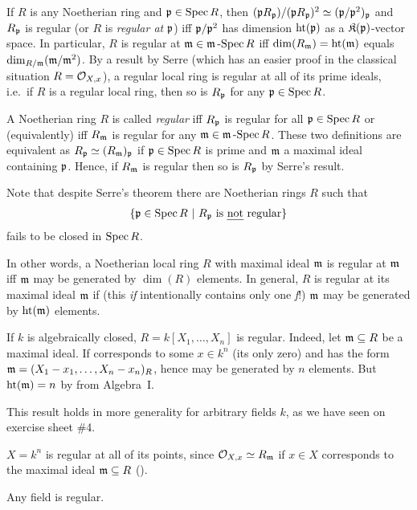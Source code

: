 \documentclass[a4paper,parskip=half,numbers=enddot, DIV=12, headheight=30pt]{scrreprt}
\begin{document}
\begin{rem}
    If $R$ is any Noetherian ring and $\mathfrak{p}\in \operatorname{Spec} R$, then $(\mathfrak{p} R_{\mathfrak{p}})/(\mathfrak{p} R_{\mathfrak{p}})^2 \simeq (\mathfrak{p}/\mathfrak{p}^2)_{\mathfrak{p}}$ and $R_{\mathfrak{p}}$ is regular (or $R$ is \emph{regular at} $\mathfrak{p}$) iff $\mathfrak{p}/\mathfrak{p}^2$ has dimension $\operatorname{ht}(\mathfrak{p})$ as a $\mathfrak{K}(\mathfrak{p})$-vector space. In particular, $R$ is regular at $\mathfrak{m}\in\mathfrak{m}\operatorname{-Spec} R$ iff $\dim(R_{\mathfrak{m}}) = \operatorname{ht}(\mathfrak{m})$ equals $\dim_{R/\mathfrak{m}} (\mathfrak{m}/\mathfrak{m}^2)$. By a result by Serre (which has an easier proof in the classical situation $R=\mathcal{O}_{X,x}$), a regular local ring is regular at all of its prime ideals, i.e.\ if $R$ is a regular local ring, then so is $R_{\mathfrak{p}}$ for any $\mathfrak{p}\in \operatorname{Spec} R$. 
    
    A Noetherian ring $R$ is called \emph{regular} iff $R_{\mathfrak{p}}$ is regular for all $\mathfrak{p}\in\operatorname{Spec} R$ or (equivalently) iff $R_{\mathfrak{m}}$ is regular for any $\mathfrak{m}\in\mathfrak{m}\operatorname{-Spec} R$. These two definitions are equivalent as $R_{\mathfrak{p}}\simeq (R_{\mathfrak{m}})_{\mathfrak{p}}$ if $\mathfrak{p}\in\operatorname{Spec} R$ is prime and $\mathfrak{m}$ a maximal ideal containing $\mathfrak{p}$. Hence, if $R_{\mathfrak{m}}$ is regular then so is $R_{\mathfrak{p}}$ by Serre's result. 
    
    Note that despite Serre's theorem there are Noetherian rings $R$ such that 
    \begin{align*}
    	\left\{\mathfrak{p}\in\operatorname{Spec} R\ \middle|\  R_{\mathfrak{p}}\text{ is \emph{not} regular}\right\}
    \end{align*}
    fails to be closed in $\operatorname{Spec} R$.
\end{rem}
\begin{rem*}
    In other words, a Noetherian local ring $R$ with maximal ideal $\mathfrak{m}$ is regular at $\mathfrak{m}$ iff $\mathfrak{m}$ may be generated by $\dim (R)$ elements. In general, $R$ is regular at its maximal ideal $\mathfrak{m}$ if (this \emph{if} intentionally contains only one \emph{f}!) $\mathfrak{m}$ may be generated by $\operatorname{ht}(\mathfrak{m})$ elements.
\end{rem*}
\begin{example*}
    \begin{alphanumerate}
        \item 
            If $k$ is algebraically closed, $R= k[X_1,\ldots,X_n]$ is regular. Indeed, let $\mathfrak{m}\subseteq R$ be a maximal ideal. If corresponds to some $x\in k^n$ (its only zero) and has the form $\mathfrak{m} = ( X_1-x_1,\ldots, X_n-x_n)_R$, hence may be generated by $n$ elements. But $\operatorname{ht}(\mathfrak{m}) = n$ by \cite[Theorem~10]{alg1} from Algebra~I.
            
            This result holds in more generality for arbitrary fields $k$, as we have seen on exercise sheet \#4.
        \item 
            $X=k^n$ is regular at all of its points, since $\mathcal{O}_{X,x} \simeq R_{\mathfrak{m}}$ if $x\in X$ corresponds to the maximal ideal $\mathfrak{m}\subseteq R$ (\cite[Proposition~2.3.4]{alg1}).
        \item 
            Any field is regular.
    \end{alphanumerate}
\end{example*}
\end{document}
